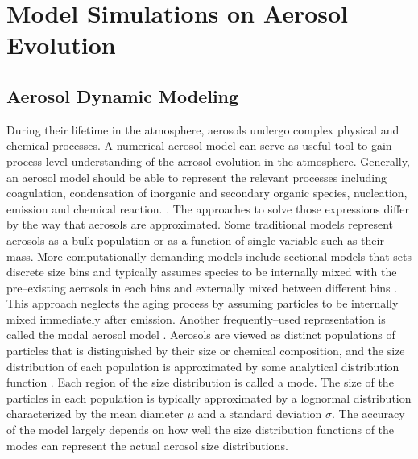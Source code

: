 \documentclass[12pt, fullpage]{uiucthesis2009}
\begin{document}
\newpage

	\section{Model Simulations on Aerosol Evolution}
		\subsection{Aerosol Dynamic Modeling}
		During their lifetime in the atmosphere, aerosols undergo complex physical and chemical processes. A numerical aerosol model can serve as useful tool to gain process-level understanding of the aerosol evolution in the atmosphere. Generally, an aerosol model should be able to represent the relevant processes including coagulation, condensation of inorganic and secondary organic species, nucleation, emission and chemical reaction. \citep{whitby1997}. The approaches to solve those expressions differ by the way that aerosols are approximated. Some traditional models represent aerosols as a bulk population or as a function of single variable such as their mass. More computationally demanding models include sectional models that sets discrete size bins and typically assumes species to be internally mixed with the pre--existing aerosols in each bins and externally mixed between different bins \citep[][]{jacobson2001strong,adams1999global}. This approach neglects the aging process by assuming particles to be internally mixed immediately after emission. Another frequently--used representation is called the modal aerosol model \citep[][]{whitby1997,Binkowski1995}. Aerosols are viewed as distinct populations of particles that is distinguished by their size or chemical composition, and the size distribution of each population is approximated by some analytical distribution function \citep{Binkowski1995}. Each region of the size distribution is called a mode. The size of the particles in each population is typically approximated by a lognormal distribution characterized by the mean diameter $\mu$ and a standard deviation $\sigma$. The accuracy of the model largely depends on how well the size distribution functions of the modes can represent the actual aerosol size distributions.  
		
\end{document}
